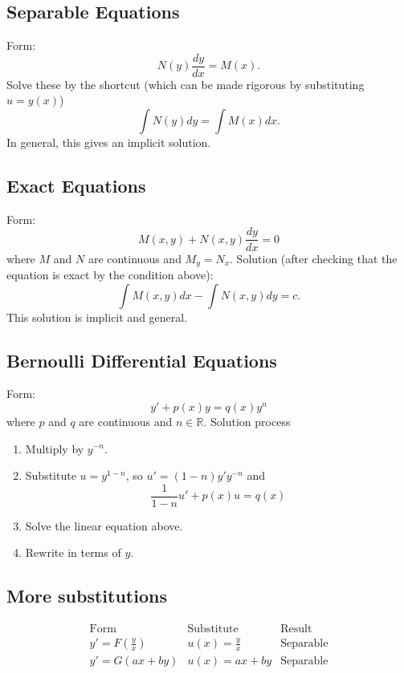 \documentclass[12pt]{article}
\theoremstyle{definition}
\begin{document}
\subsection{Separable Equations}
Form: \begin{equation*}
	N(y) \frac{dy}{dx} = M(x).
\end{equation*}
Solve these by the shortcut (which can be made rigorous by substituting $u = y(x)$)\begin{equation*}
	\int N(y)dy = \int M(x)dx.
\end{equation*}
In general, this gives an implicit solution.

\subsection{Exact Equations}
Form:\begin{equation*}
	M(x, y) + N(x, y)\frac{dy}{dx}=0
\end{equation*}
where $M$ and $N$ are continuous and $M_y = N_x$.
Solution (after checking that the equation is exact by the condition above): \begin{equation*}
	\int M(x, y) dx - \int N(x, y) dy = c.
\end{equation*}
This solution is implicit and general.

\subsection{Bernoulli Differential Equations}
Form: \begin{equation*}
	y' + p(x)y = q(x)y^n
\end{equation*}
where $p$ and $q$ are continuous and $n \in \mathbb{R}$.
Solution process \begin{enumerate}
	\item Multiply by $y^{-n}$.
	\item Substitute $u = y^{1-n}$, so $u' = (1-n)y'y^{-n}$ and \begin{equation*}
		      \frac{1}{1-n}u' + p(x)u = q(x)
	      \end{equation*}
	\item Solve the linear equation above.
	\item Rewrite in terms of $y$.
\end{enumerate}

\subsection{More substitutions}
\begin{equation*}
	\begin{array}{l|l|l}
		\text{Form}                           & \text{Substitute}  & \text{Result}    \\
		\hline y' = F\left(\frac{y}{x}\right) & u(x) = \frac{y}{x} & \text{Separable} \\
		y' = G(ax+by)                         & u(x)=ax+by         & \text{Separable}
	\end{array}
\end{equation*}
\end{document}
